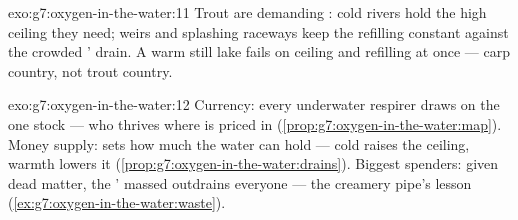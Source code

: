 \begin{solution}{exo:g7:oxygen-in-the-water:11}
Trout are demanding : cold rivers hold the high
ceiling they need; weirs and splashing raceways keep the
refilling constant against the crowded ' drain. A
warm still lake fails on ceiling and refilling at once ---
carp country, not trout country.
\end{solution}

\begin{solution}{exo:g7:oxygen-in-the-water:12}
Currency: every underwater respirer draws on the one
 stock --- who thrives where is priced in 
(\cref{prop:g7:oxygen-in-the-water:map}). Money supply:
 sets how much the water can hold --- cold
raises the ceiling, warmth lowers it
(\cref{prop:g7:oxygen-in-the-water:drains}). Biggest
spenders: given dead matter, the ' massed
 outdrains everyone --- the creamery pipe's
lesson (\cref{ex:g7:oxygen-in-the-water:waste}).
\end{solution}

